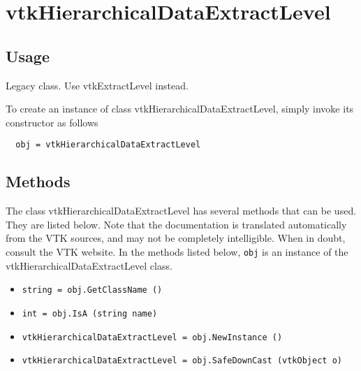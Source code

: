 \section{vtkHierarchicalDataExtractLevel}

\subsection{Usage}

 Legacy class. Use vtkExtractLevel instead.

To create an instance of class vtkHierarchicalDataExtractLevel, simply
invoke its constructor as follows
\begin{verbatim}
  obj = vtkHierarchicalDataExtractLevel
\end{verbatim}
\subsection{Methods}

The class vtkHierarchicalDataExtractLevel has several methods that can be used.
  They are listed below.
Note that the documentation is translated automatically from the VTK sources,
and may not be completely intelligible.  When in doubt, consult the VTK website.
In the methods listed below, \verb|obj| is an instance of the vtkHierarchicalDataExtractLevel class.
\begin{itemize}
\item  \verb|string = obj.GetClassName ()|

\item  \verb|int = obj.IsA (string name)|

\item  \verb|vtkHierarchicalDataExtractLevel = obj.NewInstance ()|

\item  \verb|vtkHierarchicalDataExtractLevel = obj.SafeDownCast (vtkObject o)|

\end{itemize}
